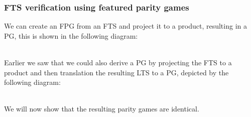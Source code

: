 \subsubsection{FTS verification using featured parity games}
We can create an FPG from an FTS and project it to a product, resulting in a PG, this is shown in the following diagram:\\
\\
Earlier we saw that we could also derive a PG by projecting the FTS to a product and then translation the resulting LTS to a PG, depicted by the following diagram:
\\\\
We will now show that the resulting parity games are identical.
